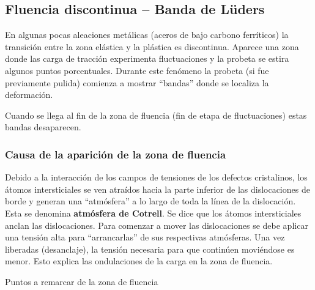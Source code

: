 \subsection{Fluencia discontinua -- Banda de Lüders}

En algunas pocas aleaciones metálicas (aceros de bajo carbono ferríticos) la \linebreak transición entre la zona elástica y la plástica es discontinua. Aparece una zona donde las carga de tracción experimenta fluctuaciones y la probeta se estira algunos puntos porcentuales. Durante este fenómeno la probeta (si fue previamente pulida) comienza a mostrar ``bandas'' donde se localiza la deformación.

Cuando se llega al fin de la zona de fluencia (fin de etapa de fluctuaciones) estas bandas desaparecen.

\subsubsection{Causa de la aparición de la zona de fluencia}
Debido a la interacción de los campos de tensiones de los defectos cristalinos, los átomos intersticiales se ven atraídos hacia la parte inferior de las dislocaciones de borde y generan una ``atmósfera'' a lo largo de toda la línea de la dislocación. Esta se denomina \textbf{atmósfera de Cotrell}. Se dice que los átomos intersticiales anclan las dislocaciones. Para comenzar a mover las dislocaciones se debe aplicar una tensión alta para ``arrancarlas'' de sus respectivas atmósferas. Una vez liberadas (desanclaje), la tensión necesaria para que continúen moviéndose es menor. Esto explica las ondulaciones de la carga en la zona de fluencia.

Puntos a remarcar de la zona de fluencia

